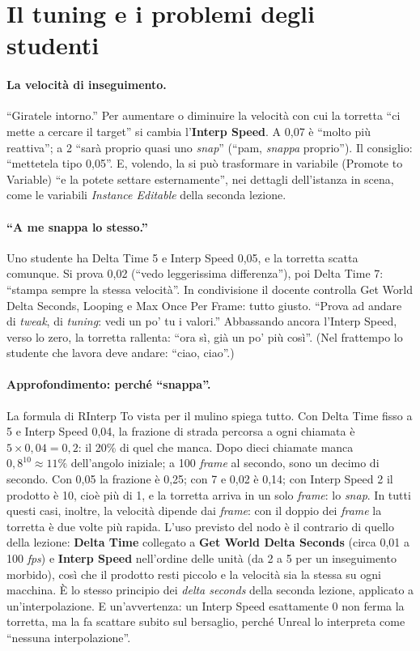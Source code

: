 \section{Il tuning e i problemi degli studenti}
\label{ue4:sec:problemi}

\paragraph{La velocità di inseguimento.} ``Giratele intorno.'' Per aumentare o diminuire
la velocità con cui la torretta ``ci mette a cercare il target'' si cambia l'\textbf{Interp
Speed}. A 0,07 è ``molto più reattiva''; a 2 ``sarà proprio quasi uno \emph{snap}''
(``pam, \emph{snappa} proprio''). Il consiglio: ``mettetela tipo 0,05''. E, volendo, la
si può trasformare in variabile (Promote to Variable) ``e la potete settare
esternamente'', nei dettagli dell'istanza in scena, come le variabili \emph{Instance
Editable} della seconda lezione.

\paragraph{``A me snappa lo stesso.''} Uno studente ha Delta Time 5 e Interp Speed 0,05,
e la torretta scatta comunque. Si prova 0,02 (``vedo leggerissima differenza''), poi
Delta Time 7: ``stampa sempre la stessa velocità''. In condivisione il docente controlla
Get World Delta Seconds, Looping e Max Once Per Frame: tutto giusto. ``Prova ad andare di
\emph{tweak}, di \emph{tuning}: vedi un po' tu i valori.'' Abbassando ancora l'Interp
Speed, verso lo zero, la torretta rallenta: ``ora sì, già un po' più così''. (Nel
frattempo lo studente che lavora deve andare: ``ciao, ciao''.)

\paragraph{Approfondimento: perché ``snappa''.} La formula di RInterp To vista per il
mulino spiega tutto. Con Delta Time fisso a 5 e Interp Speed 0,04, la frazione di
strada percorsa a ogni chiamata è $5 \times 0{,}04 = 0{,}2$: il 20\% di quel che manca.
Dopo dieci chiamate manca $0{,}8^{10} \approx 11\%$ dell'angolo iniziale; a 100
\emph{frame} al secondo, sono un decimo di secondo. Con 0,05 la frazione è 0,25; con 7
e 0,02 è 0,14; con Interp Speed 2 il prodotto è 10, cioè più di 1, e la torretta arriva
in un solo \emph{frame}: lo \emph{snap}. In tutti questi casi, inoltre, la velocità
dipende dai \emph{frame}: con il doppio dei \emph{frame} la torretta è due volte più
rapida. L'uso previsto del nodo è il contrario di quello della lezione: \textbf{Delta
Time} collegato a \textbf{Get World Delta Seconds} (circa 0,01 a 100 \emph{fps}) e
\textbf{Interp Speed} nell'ordine delle unità (da 2 a 5 per un inseguimento morbido),
così che il prodotto resti piccolo e la velocità sia la stessa su ogni macchina. È lo
stesso principio dei \emph{delta seconds} della seconda lezione, applicato a
un'interpolazione. E un'avvertenza: un Interp Speed esattamente 0 non ferma la torretta,
ma la fa scattare subito sul bersaglio, perché Unreal lo interpreta come ``nessuna
interpolazione''.

